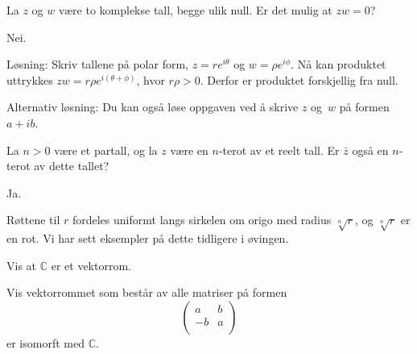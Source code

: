 \begin{oppgave}
La $z$ og $w$ være to komplekse tall, begge ulik null. Er det mulig at $zw=0$?
\end{oppgave}

\begin{losning}
Nei.

\noindent
Løsning: Skriv tallene på polar form, $z=re^{i\theta}$ og $w=\rho e^{i\phi}$. Nå kan produktet uttrykkes $zw=r\rho e^{i(\theta+\phi)}$, hvor $r \rho>0$. Derfor er produktet forskjellig fra null.

\noindent
Alternativ løsning: Du kan også løse oppgaven ved å skrive $z$ og~$w$ på formen $a+ib$.
\end{losning}



\begin{oppgave}
La $n>0$ være et partall, og la $z$ være en $n$-terot av et reelt tall. Er $\bar{z}$ også en $n$-terot av dette tallet?
\end{oppgave}

\begin{losning}
Ja.

\noindent
Røttene til $r$ fordeles uniformt langs sirkelen om origo med radius $\sqrt[n]{r}$, og $\sqrt[n]{r}$ er en rot. Vi har sett eksempler på dette tidligere i øvingen.
\end{losning}

\begin{oppgave}
Vis at $\mathbb C$ er et vektorrom.
\end{oppgave}

\begin{oppgave}
Vis vektorrommet som består av alle matriser på formen 
\[
\begin{pmatrix}
a & b \\
-b & a \\
\end{pmatrix}
\]
er isomorft med $\mathbb C$. 
\end{oppgave}



